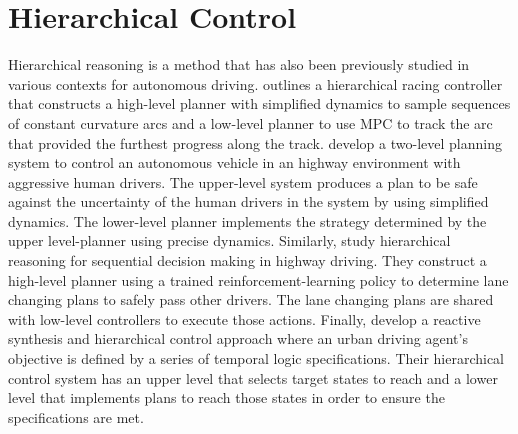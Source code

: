 \section{Hierarchical Control}
Hierarchical reasoning is a method that has also been previously studied in various contexts for autonomous driving. \citet{LinigerThesis} outlines a hierarchical racing controller that constructs a high-level planner with simplified dynamics to sample sequences of constant curvature arcs and a low-level planner to use MPC to track the arc that provided the furthest progress along the track. \citet{Fisac2019} develop a two-level planning system to control an autonomous vehicle in an highway environment with aggressive human drivers. The upper-level system produces a plan to be safe against the uncertainty of the human drivers in the system by using simplified dynamics. The lower-level planner implements the strategy determined by the upper level-planner using precise dynamics. Similarly, \citet{Moghadam2019} study hierarchical reasoning for sequential decision making in highway driving. They construct a high-level planner using a trained reinforcement-learning policy to determine lane changing plans to safely pass other drivers. The lane changing plans are shared with low-level controllers to execute those actions. Finally, \citet{Wongpiromsarn2012} develop a reactive synthesis and hierarchical control approach where an urban driving agent's objective is defined by a series of temporal logic specifications. Their hierarchical control system has an upper level that selects target states to reach and a lower level that implements plans to reach those states in order to ensure the specifications are met.